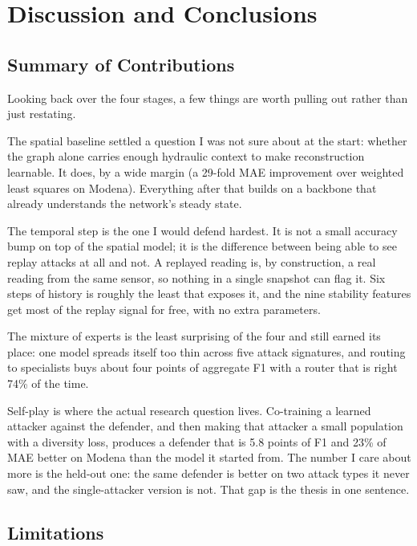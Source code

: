 \chapter{Discussion and Conclusions}
\label{ch:conclusions}

\section{Summary of Contributions}
\label{sec:summary}

Looking back over the four stages, a few things are worth pulling
out rather than just restating.

The spatial baseline settled a question I was not sure about at the
start: whether the graph alone carries enough hydraulic context to
make reconstruction learnable. It does, by a wide margin (a 29-fold
MAE improvement over weighted least squares on Modena). Everything
after that builds on a backbone that already understands the
network's steady state.

The temporal step is the one I would defend hardest. It is not a
small accuracy bump on top of the spatial model; it is the
difference between being able to see replay attacks at all and not.
A replayed reading is, by construction, a real reading from the
same sensor, so nothing in a single snapshot can flag it. Six steps
of history is roughly the least that exposes it, and the nine
stability features get most of the replay signal for free, with no
extra parameters.

The mixture of experts is the least surprising of the four and
still earned its place: one model spreads itself too thin across
five attack signatures, and routing to specialists buys about four
points of aggregate F1 with a router that is right 74\% of the
time.

Self-play is where the actual research question lives. Co-training
a learned attacker against the defender, and then making that
attacker a small population with a diversity loss, produces a
defender that is 5.8 points of F1 and 23\% of MAE better on Modena
than the model it started from. The number I care about more is the
held-out one: the same defender is better on two attack types it
never saw, and the single-attacker version is not. That gap is the
thesis in one sentence.

\section{Limitations}
\label{sec:limitations}

